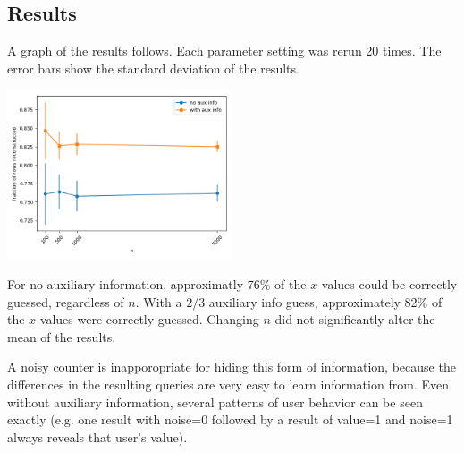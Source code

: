 \subsection{Results}

A graph of the results follows.  Each parameter setting was rerun 20 times.  The error bars show the standard
deviation of the results.

\begin{center}
    \includegraphics[width=0.5\textwidth]{running_counter.png}
\end{center}

For no auxiliary information, approximatly 76\% of the $x$ values could be
correctly guessed, regardless of $n$.  With a $2/3$ auxiliary info guess, approximately 82\% of the $x$ values
were correctly guessed.  Changing $n$ did not significantly alter the mean of the results.

A noisy counter is inapporopriate for hiding this form of information, because the differences in the
resulting queries are very easy to learn information from.  Even without auxiliary information, several
patterns of user behavior can be seen exactly (e.g. one result with noise=0 followed by a result of value=1
and noise=1 always reveals that user's value).

%
